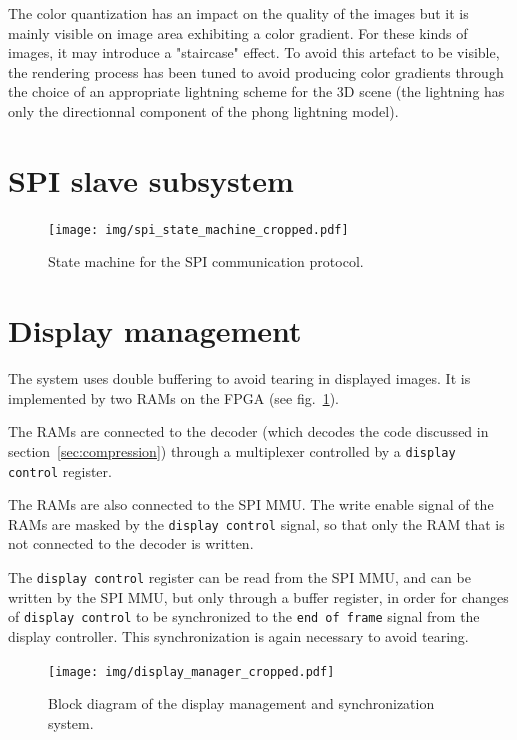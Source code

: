 \documentclass[english, DIV=13]{scrartcl}
\begin{document}
The color quantization has an impact on the quality of the images
but it is mainly visible on image area exhibiting a color gradient.
For these kinds of images,
it may introduce a "staircase" effect. To avoid this artefact to be visible,
the rendering process has been tuned to avoid producing color gradients
through the choice of an appropriate lightning scheme for the 3D scene (the lightning
has only the directionnal component of the phong lightning model).

\section{SPI slave subsystem}
\label{sec:spi}

\begin{figure}
    \centering
    \texttt{[image: img/spi\_state\_machine\_cropped.pdf]}
    \caption{State machine for the SPI communication protocol.}
\end{figure}

\section{Display management}
\label{sec:display-mngt}

The system uses double buffering to avoid tearing in displayed images.
It is implemented by two RAMs on the FPGA (see fig.~\ref{fig:display-manager}).

The RAMs are connected to the decoder
(which decodes the code discussed in section~\ref{sec:compression})
through a multiplexer controlled by a \texttt{display control} register.

The RAMs are also connected to the SPI MMU. The write enable
signal of the RAMs are masked by the \texttt{display control} signal,
so that only the RAM that is not connected to the decoder is written.

The \texttt{display control} register can be read from the SPI MMU,
and can be written by the SPI MMU, but only through a buffer register,
in order for changes of \texttt{display control} to be synchronized
to the \texttt{end of frame} signal from the display controller.
This synchronization is again necessary to avoid tearing.

\begin{figure}
    \centering
    \texttt{[image: img/display\_manager\_cropped.pdf]}
    \caption{Block diagram of the display management and synchronization system.}
    \label{fig:display-manager}
\end{figure}
\end{document}
